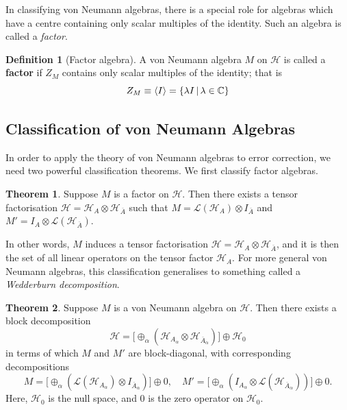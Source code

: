 \documentclass[12pt,a4paper]{report}
\numberwithin{equation}{section}
\newcommand{\ol}[1]{\overline{#1}}
\theoremstyle{definition}
\newtheorem{definition}{Definition}[section]
\theoremstyle{theorem}
\newtheorem{theorem}{Theorem}[section]
\theoremstyle{theorem}
\theoremstyle{example}
\theoremstyle{definition}
\begin{document}
In classifying von Neumann algebras, there is a special role for algebras which have a centre containing only scalar multiples of the identity. Such an algebra is called a \textit{factor}.
\begin{definition}[Factor algebra]
	A von Neumann algebra $M$ on $\mathcal{H}$ is called a \textbf{factor} if $Z_{M}$ contains only scalar multiples of the identity; that is
	\begin{equation}
		Z_{M}\equiv\braket{I}=\{\lambda I\,|\,\lambda\in\mathbb{C}\}
	\end{equation}
\end{definition}
\subsection{Classification of von Neumann Algebras}
In order to apply the theory of von Neumann algebras to error correction, we need two powerful classification theorems. We first classify factor algebras.
\begin{theorem}\label{factorclass}
	Suppose $M$ is a factor on $\mathcal{H}$. Then there exists a tensor factorisation $\mathcal{H}=\mathcal{H}_{A}\otimes\mathcal{H}_{\ol{A}}$ such that $M=\mathcal{L}(\mathcal{H}_{A})\otimes I_{\ol{A}}$ and $M'=I_{A}\otimes\mathcal{L}(\mathcal{H}_{\ol{A}})$.
\end{theorem}
In other words, $M$ induces a tensor factorisation $\mathcal{H}=\mathcal{H}_{A}\otimes\mathcal{H}_{\ol{A}}$, and it is then the set of all linear operators on the tensor factor $\mathcal{H}_{A}$. For more general von Neumann algebras, this classification generalises to something called a \textit{Wedderburn decomposition}.
\begin{theorem}\label{vnclass}
	Suppose $M$ is a von Neumann algebra on $\mathcal{H}$. Then there exists a block decomposition 
	\begin{equation} 
		\mathcal{H}=\big[\oplus_{\alpha}(\mathcal{H}_{A_{\alpha}}\otimes\mathcal{H}_{\ol{A}_{\alpha}})\big]\oplus \mathcal{H}_{0}
	\end{equation}
	in terms of which $M$ and $M'$ are block-diagonal, with corresponding decompositions
	\begin{equation}\label{wburn}
		M=\big[\oplus_{\alpha}(\mathcal{L}(\mathcal{H}_{A_{\alpha}})\otimes I_{\ol{A}_{\alpha}})\big]\oplus0,\quad M'=\big[\oplus_{\alpha}(I_{A_{\alpha}}\otimes\mathcal{L}(\mathcal{H}_{\ol{A}_{\alpha}}))\big]\oplus0.
	\end{equation}
	Here, $\mathcal{H}_{0}$ is the null space, and $0$ is the zero operator on $\mathcal{H}_{0}$.
\end{theorem}
\end{document}
